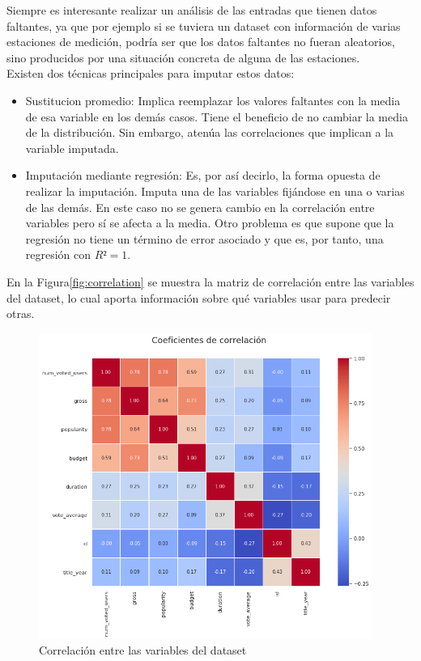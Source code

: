 Siempre es interesante realizar un análisis de las entradas que tienen datos faltantes, ya que por ejemplo si se tuviera un dataset con información de varias estaciones de medición, podría ser que los datos faltantes no fueran aleatorios, sino producidos por una situación concreta de alguna de las estaciones.\\

Existen dos técnicas principales para imputar estos datos:

\begin{itemize}
    \item Sustitucion promedio: Implica reemplazar los valores faltantes con la media de esa variable en los demás casos. Tiene el beneficio de no cambiar la media de la distribución. Sin embargo, atenúa las correlaciones que implican a la variable imputada.
    \item Imputación mediante regresión: Es, por así decirlo, la forma opuesta de realizar la imputación. Imputa una de las variables fijándose en una o varias de las demás. En este caso no se genera cambio en la correlación entre variables pero sí se afecta a la media. Otro problema es que supone que la regresión no tiene un término de error asociado y que es, por tanto, una regresión con $R² = 1$.
\end{itemize}

En la Figura\ref{fig:correlation} se muestra la matriz de correlación entre las variables del dataset, lo cual aporta información sobre qué variables usar para predecir otras.

\begin{figure}[H]
    \centering
    \captionsetup{width=12cm}
    \includegraphics[height=10cm]{./contenido/imagenes/correlation.png}
\caption{Correlación entre las variables del dataset}
\label{fig:corelation}
\end{figure}

